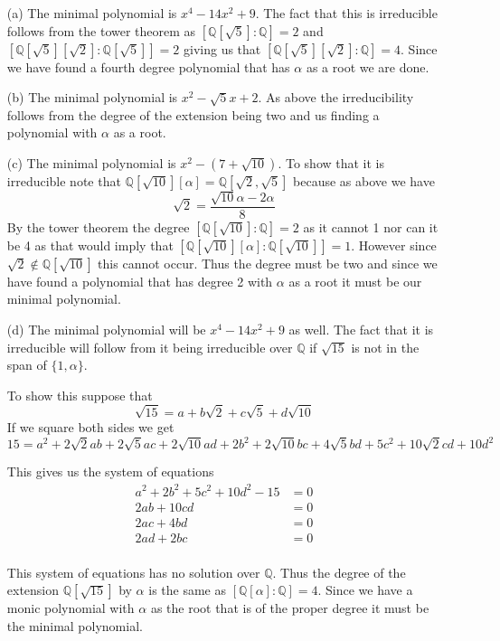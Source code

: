 \documentclass[10pt]{article}
\newcommand{\bb}[1]{\mathbb{#1}}
\theoremstyle{plain}
\theoremstyle{remark}
\begin{document}
\begin{enumerate}
\item[(a)] The minimal polynomial is $x^4-14x^2+9$. The fact that this is irreducible
  follows from the tower theorem as $[\bb{Q}[\sqrt{5}]:\bb{Q}]=2$ and
  $[\bb{Q}[\sqrt{5}][\sqrt{2}]:\bb{Q}[\sqrt{5}]]=2$ giving us that
  $[\bb{Q}[\sqrt{5}][\sqrt{2}]:\bb{Q}]=4$. Since we have found a fourth
  degree polynomial that has $\alpha$ as a root we are done.
\item[(b)] The minimal polynomial is $x^2-\sqrt{5}x+2$. As above the irreducibility
  follows from the degree of the extension being two and us finding a polynomial
  with $\alpha$ as a root.
\item[(c)] The minimal polynomial is $x^2-(7+\sqrt{10})$. To show that
  it is irreducible note that $\bb{Q}[\sqrt{10}][\alpha]=\bb{Q}[\sqrt{2},\sqrt{5}]$ because
  as above we have
  \[ \sqrt{2} = \frac{\sqrt{10}\alpha-2\alpha}{8} \]
  By the tower theorem the degree $[\bb{Q}[\sqrt{10}]:\bb{Q}]=2$ as it cannot 1 nor can it
  be 4 as that would imply that $[\bb{Q}[\sqrt{10}][\alpha]:\bb{Q}[\sqrt{10}]]=1$. However since
  $\sqrt{2}\notin\bb{Q}[\sqrt{10}]$ this cannot occur. Thus the degree must be two and since
  we have found a polynomial that has degree 2 with $\alpha$ as a root it must be our minimal polynomial.
\item[(d)] The minimal polynomial will be $x^4-14x^2+9$ as well. The
  fact that it is irreducible will follow from it being irreducible over
  $\bb{Q}$ if $\sqrt{15}$ is not in the span of $\{1,\alpha\}$.

  To show this suppose that 
  \[ \sqrt{15} = a +b\sqrt{2}+c\sqrt{5}+d\sqrt{10} \]
  If we square both sides we get
  \[15 = a^2 + 2\sqrt{2} a b + 2\sqrt{5} a c + 2\sqrt{10} a d
    + 2 b^2 + 2\sqrt{10} b c + 4\sqrt{5} b d + 5 c^2 + 10\sqrt{2} c d + 10 d^2 \]

  This gives us the system of equations
  \begin{align*}
    a^2+2b^2+5c^2+10d^2-15 &= 0\\
    2ab+10cd &= 0\\
    2ac+4bd &= 0\\
    2ad+2bc &= 0\\
  \end{align*}

  This system of equations has no solution over $\bb{Q}$. Thus the degree of
  the extension $\bb{Q}[\sqrt{15}]$ by $\alpha$ is the same as $[\bb{Q}[\alpha]:\bb{Q}]=4$.
  Since we have a monic polynomial with $\alpha$ as the root that is of the proper degree it
  must be the minimal polynomial.
\end{enumerate}
\end{document}

